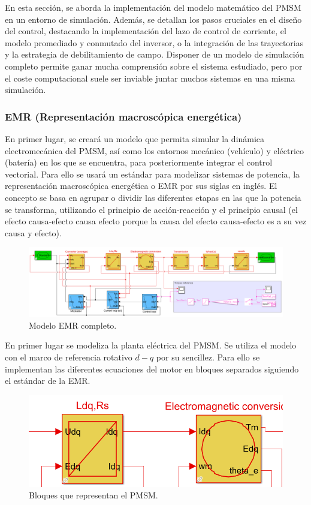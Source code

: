 En esta sección, se aborda la implementación del modelo matemático del PMSM en un entorno de simulación. Además, se detallan los pasos cruciales en el diseño del control, destacando la implementación del lazo de control de corriente, el modelo promediado y conmutado del inversor, o la integración de las trayectorias y la estrategia de debilitamiento de campo. Disponer de un modelo de simulación completo permite ganar mucha comprensión sobre el sistema estudiado, pero por el coste computacional suele ser inviable juntar muchos sistemas en una misma simulación.

\subsubsection{EMR (Representación macroscópica energética)}
En primer lugar, se creará un modelo que permita simular la dinámica electromecánica del PMSM, así como los entornos mecánico (vehículo) y eléctrico (batería) en los que se encuentra, para posteriormente integrar el control vectorial. Para ello se usará un estándar para modelizar sistemas de potencia, la representación macroscópica energética o EMR por sus siglas en inglés. El concepto se basa en agrupar o dividir las diferentes etapas en las que la potencia se transforma, utilizando el principio de acción-reacción y el principio causal (el efecto causa-efecto causa efecto porque la causa del efecto causa-efecto es a su vez causa y efecto). 


\begin{figure}[H]
	\centering
	\includegraphics[width=1\linewidth]{fig/EMR_FULL.png}
	\caption{Modelo EMR completo.}
\end{figure}

En primer lugar se modeliza la planta eléctrica del PMSM. Se utiliza el modelo con el marco de referencia rotativo $d-q$ por su sencillez. Para ello se implementan las diferentes ecuaciones del motor en bloques separados siguiendo el estándar de la EMR.

\begin{figure}[H]
    \centering
    \includegraphics[width=0.7\linewidth]{fig/motorEMR1.png}
    \caption{Bloques que representan el PMSM.}
\end{figure}

